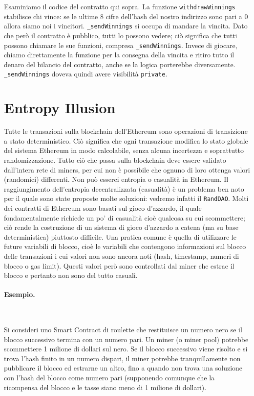 Esaminiamo il codice del contratto qui sopra.
La funzione \verb|withdrawWinnings| stabilisce chi
vince: se le ultime 8 cifre dell'hash
del nostro indirizzo sono pari a $0$
allora siamo noi i vincitori.
\verb|_sendWinnings| si occupa di
mandare la vincita.
Dato che però il contratto è
pubblico, tutti lo possono vedere;
ciò significa che tutti possono chiamare le sue funzioni, compresa
\verb|_sendWinnings|.
Invece di giocare, chiamo direttamente la funzione per la consegna della vincita e
ritiro tutto
il denaro del bilancio del contratto, anche se la logica porterebbe diversamente.
\verb|_sendWinnings| doveva quindi avere visibilità \verb|private|.

\section{Entropy Illusion}

Tutte le transazioni sulla blockchain dell'Ethereum sono operazioni di
transizione a stato deterministico. Ciò significa che ogni transazione
modifica lo stato globale del sistema
Ethereum in modo calcolabile, senza alcuna incertezza e soprattutto randomizzazione.
Tutto ciò che passa sulla blockchain deve essere validato dall'intera rete di
miners, per cui non è
possibile che ognuno di loro ottenga valori (randomici) differenti.
Non può esserci entropia o
casualità in Ethereum.
Il raggiungimento dell'entropia decentralizzata (casualità) è un problema ben noto
per il
quale sono state proposte molte soluzioni: vedremo infatti il \verb|RandDAO|.
Molti dei contratti di Ethereum sono basati sul gioco d'azzardo, il quale
fondamentalmente
richiede un po' di casualità cioè qualcosa su cui scommettere;
ciò rende la costruzione di un
sistema di gioco d'azzardo a catena (ma su base deterministica) piuttosto difficile.
Una pratica comune è quella di utilizzare le future variabili di blocco,
cioè le variabili che
contengono informazioni sul blocco delle transazioni i cui valori non sono ancora
noti (hash, timestamp, numeri di blocco o gas limit).
Questi valori però sono controllati dal miner che
estrae il blocco e pertanto non sono del tutto casuali.

\paragraph{Esempio.}\

Si consideri uno Smart Contract di roulette che restituisce un numero nero se il
blocco successivo termina con un numero pari.
Un miner (o miner pool) potrebbe scommettere 1 milione di dollari sul nero.
Se il blocco
successivo viene risolto e si trova l'hash finito in un numero dispari,
il miner potrebbe
tranquillamente non pubblicare il blocco ed estrarne un altro,
fino a quando non trova una
soluzione con l'hash del blocco come numero pari (supponendo comunque che la
ricompensa del blocco e le tasse siano meno di 1 milione di dollari).

